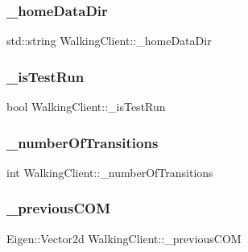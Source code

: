 \hypertarget{classWalkingClient_ade3bf018661152fc0404d3973ea30783}{}\label{classWalkingClient_ade3bf018661152fc0404d3973ea30783} 
\subsubsection{\texorpdfstring{\+\_\+home\+Data\+Dir}{\_homeDataDir}}
{\footnotesize\ttfamily std\+::string Walking\+Client\+::\+\_\+home\+Data\+Dir\hspace{0.3cm}{\ttfamily [private]}}

\hypertarget{classWalkingClient_a4f9c8688537ddd8a487a212fbb279a9b}{}\label{classWalkingClient_a4f9c8688537ddd8a487a212fbb279a9b} 
\subsubsection{\texorpdfstring{\+\_\+is\+Test\+Run}{\_isTestRun}}
{\footnotesize\ttfamily bool Walking\+Client\+::\+\_\+is\+Test\+Run\hspace{0.3cm}{\ttfamily [private]}}

\hypertarget{classWalkingClient_aefb4ed994a32879a526f2bc8c962927f}{}\label{classWalkingClient_aefb4ed994a32879a526f2bc8c962927f} 
\subsubsection{\texorpdfstring{\+\_\+number\+Of\+Transitions}{\_numberOfTransitions}}
{\footnotesize\ttfamily int Walking\+Client\+::\+\_\+number\+Of\+Transitions\hspace{0.3cm}{\ttfamily [private]}}

\hypertarget{classWalkingClient_a549751e511e023d5fc73eccd1c185317}{}\label{classWalkingClient_a549751e511e023d5fc73eccd1c185317} 
\subsubsection{\texorpdfstring{\+\_\+previous\+C\+OM}{\_previousCOM}}
{\footnotesize\ttfamily Eigen\+::\+Vector2d Walking\+Client\+::\+\_\+previous\+C\+OM\hspace{0.3cm}{\ttfamily [private]}}

